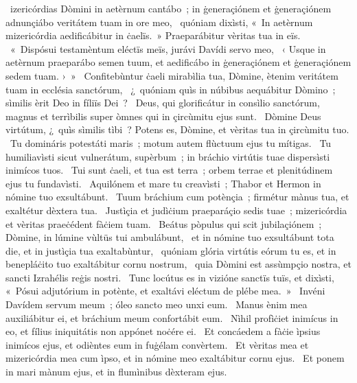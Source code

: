 \psalmChapterWithInscription{}
{ }
{%
~izericórdias Dòmini in aetèrnum cantábo~; in ġeneraçiónem et ġeneraçiónem adnunçiábo veritátem tuam in ore meo, 
~quóniam dixìsti, «~In aetèrnum mizericórdia aedificábitur in ċaelïs.~» Praeparábitur vèritas tua in eïs. 
~«~Dispósui testamèntum eléctïs meïs, jurávi Davídi servo meo, 
~‹ Usque in aetèrnum praeparábo semen tuum, et aedificábo in ġeneraçiónem et ġeneraçiónem sedem tuam. ›~»
~Confitebùntur ċaeli mirabìlia tua, Dòmine, ètenim veritátem tuam in ecclésia sanctórum, 
~¿~quóniam quìs in núbibus aequábitur Dòmino~; sìmilis èrit Deo in fíliïs Dei~? 
~Deus, qui glorificátur in consìlio sanctórum, magnus et terrìbilis super òmnes qui in çircùmitu ejus sunt. 
~Dòmine Deus virtútum, ¿~quìs sìmilis tìbi~? Potens es, Dòmine, et vèritas tua in çircùmitu tuo. 
~Tu domináris potestáti maris~; motum autem flùctuum ejus tu mítigas. 
~Tu humiliavìsti sicut vulnerátum, supèrbum~; in bráchio virtútis tuae dispersìsti inimícos tuos. 
~Tui sunt ċaeli, et tua est terra~; orbem terrae et plenitúdinem ejus tu fundavìsti. 
~Aquilónem et mare tu creavìsti~; Thabor et Hermon in nómine tuo exsultábunt. 
~Tuum bráchium cum potènçia~; firmétur mànus tua, et exaltétur dèxtera tua. 
~Justìçia et judìċium praeparáçio sedis tuae~; mizericórdia et vèritas praeċédent fàċiem tuam. 
~Beátus pòpulus qui scit jubilaçiónem~; Dòmine, in lúmine vùltüs tui ambulábunt, 
~et in nómine tuo exsultábunt tota die, et in justìçia tua exaltabùntur, 
~quóniam glória virtútis eórum tu es, et in benepláċito tuo exaltábitur cornu nostrum, 
~quia Dòmini est assùmpçio nostra, et sancti Izrahélis reġis nostri. 
~Tunc locútus es in vizióne sanctïs tuïs, et dixìsti, «~Pósui adjutórium in potènte, et exaltávi eléctum de plébe mea.~» 
~Invéni Davídem servum meum~; óleo sancto meo unxi eum. 
~Manus ènim mea auxiliábitur ei, et bráchium meum confortábit eum. 
~Nìhil profìċiet inimícus in eo, et fílius iniquitátis non appónet noċére ei. 
~Et concáedem a fàċie ìpsius inimícos ejus, et odièntes eum in fuġélam convèrtem. 
~Et vèritas mea et mizericórdia mea cum ìpso, et in nómine meo exaltábitur cornu ejus. 
~Et ponem in mari mànum ejus, et in flumìnibus dèxteram ejus. 
}
